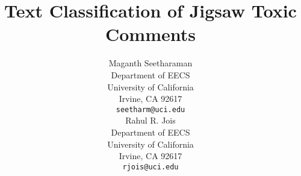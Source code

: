 \title{Text Classification of Jigsaw Toxic Comments}

%

\author{
    Maganth Seetharaman\\
    Department of EECS\\
    University of California\\
    Irvine, CA 92617 \\
    \texttt{seetharm@uci.edu} \\
    \And Rahul R. Jois\\
    Department of EECS\\
    University of California\\
    Irvine, CA 92617 \\
    \texttt{rjois@uci.edu}
}
